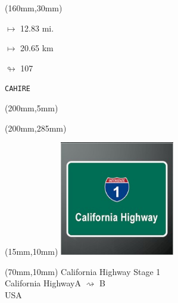 \begin{textblock*}{40mm}(160mm,30mm)%
\Large
\par$\mapsto$ 12.83 mi.
\par$\mapsto$ 20.65 km
\par$\looparrowright$ 107
\par\hfill\tiny\tt CAHIRE\\
\end{textblock*}
\begin{textblock*}{20mm}(200mm,5mm)%
\fbox{\thepage}
\label{CAHIRE}
\end{textblock*}
\begin{textblock*}{20mm}(200mm,285mm)%
\fbox{\thepage}
\end{textblock*}

\null\newpage
\begin{textblock*}{50mm}(15mm,10mm)%
\includegraphics[width=50mm]{LG/2015-05-20_00077.png}
\end{textblock*}
\begin{textblock*}{130mm}(70mm,10mm)%
{\fontsize{20}{20}\selectfont California Highway Stage 1\\}
{\fontsize{16}{16}\selectfont California Highway\hfill A $\rightsquigarrow$ B\\}
{\fontsize{12}{12}\selectfont USA\\}
\end{textblock*}
